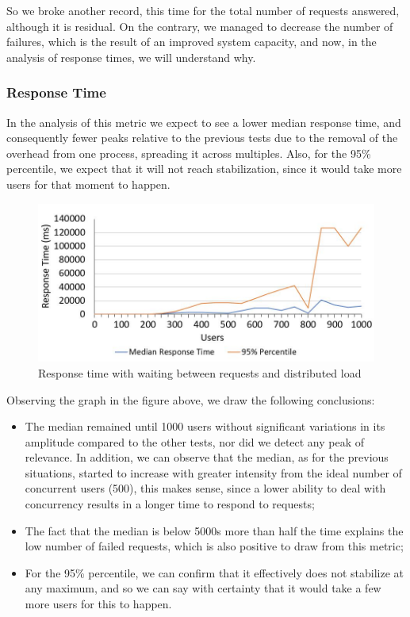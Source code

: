   So we broke another record, this time for the total number of requests answered, although it is residual. On the contrary, we managed to decrease the number of failures, which is the result of an improved system capacity, and now, in the analysis of response times, we will understand why.
  
  \subsubsection{Response Time}
  
  In the analysis of this metric we expect to see a lower median response time, and consequently fewer peaks relative to the previous tests due to the removal of the overhead from one process, spreading it across multiples. Also, for the 95\% percentile, we expect that it will not reach stabilization, since it would take more users for that moment to happen.
  
  \begin{figure}[H]
    \centering
    \includegraphics[width=1\textwidth]{img/performance_evaluation/distributed_time.JPG}
    \caption{Response time with waiting between requests and distributed load}
  \end{figure}
  
  Observing the graph in the figure above, we draw the following conclusions:
  
  \begin{itemize}
      \item The median remained until 1000 users without significant variations in its amplitude compared to the other tests, nor did we detect any peak of relevance. In addition, we can observe that the median, as for the previous situations, started to increase with greater intensity from the ideal number of concurrent users (500), this makes sense, since a lower ability to deal with concurrency results in a longer time to respond to requests;
      \item The fact that the median is below 5000s more than half the time explains the low number of failed requests, which is also positive to draw from this metric;
      \item For the 95\% percentile, we can confirm that it effectively does not stabilize at any maximum, and so we can say with certainty that it would take a few more users for this to happen.
  \end{itemize}
  
